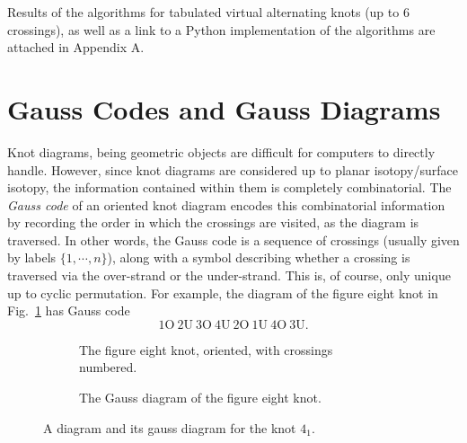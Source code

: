 \documentclass[12pt]{report}
\renewcommand{\over}{\text{O}}
\newcommand{\under}{\text{U}}
\theoremstyle{upright}
\begin{document}
Results of the algorithms for tabulated virtual alternating knots (up to 6 crossings), as well as a link to a Python implementation of the algorithms are attached in Appendix A.

\section{Gauss Codes and Gauss Diagrams}

Knot diagrams, being geometric objects are difficult for computers to directly handle. However, since knot diagrams are considered up to planar isotopy/surface isotopy, the information contained within them is completely combinatorial. The \textit{Gauss code} of an oriented knot diagram encodes this combinatorial information by recording the order in which the crossings are visited, as the diagram is traversed. In other words, the Gauss code is a sequence of crossings (usually given by labels $\{1, \cdots, n\}$), along with a symbol describing whether a crossing is traversed via the over-strand or the under-strand. This is, of course, only unique up to cyclic permutation. For example, the diagram of the figure eight knot in Fig.~\ref{fig:figure-eight-diagram} has Gauss code
\[1\over\ 2\under\ 3\over\ 4\under\ 2\over\ 1\under\ 4\over\ 3\under.\]

\begin{figure}[ht]
	\centering
	\hspace*{\fill}
	\begin{subfigure}[b]{0.4 \textwidth}
		\centering
		\def\svgscale{0.25}
		
		
		\caption{The figure eight knot, oriented, with crossings numbered.}
		\label{fig:figure-eight-diagram}
	\end{subfigure}
	\hspace*{\fill} \hspace*{\fill}	\hspace*{\fill}
	\begin{subfigure}[b]{0.4 \textwidth}
		\centering
		\def\svgscale{1.2}
		
		
		\caption{The Gauss diagram of the figure eight knot.}
		\label{fig:gauss_diagram_figure_eight}
	\end{subfigure}
	\hspace*{\fill} 
	\caption{A diagram and its gauss diagram for the knot $4_{1}$.}
	\label{fig:figure-eight}
\end{figure}
\end{document}
